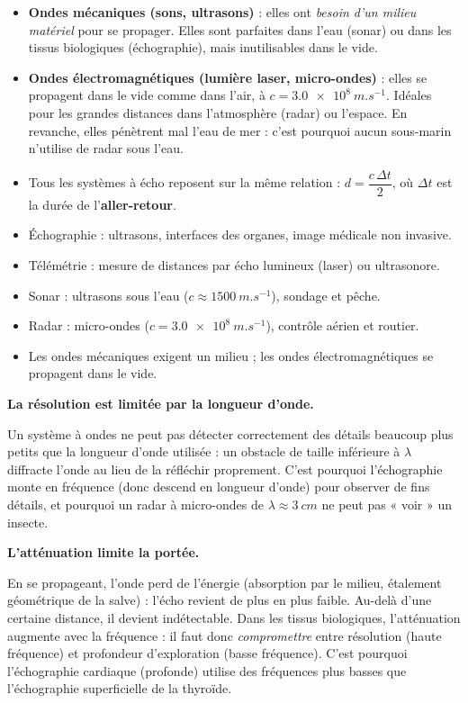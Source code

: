 \documentclass[11pt]{article}
\newcounter{popsec}
\newcounter{popsub}
\newcommand{\courssub}[1]{%
  \stepcounter{popsub}%
  \par\vspace{9pt}\noindent{\popxbold\fontsize{11.5}{13}\selectfont\color{popink}{\color{poporange}\thepopsec.\thepopsub}\hspace{6pt}#1}\par\nopagebreak\vspace{4pt}
}
\begin{document}
\begin{itemize}
\item \textbf{Ondes mécaniques (sons, ultrasons)} : elles ont \emph{besoin d'un milieu matériel} pour se propager. Elles sont parfaites dans l'eau (sonar) ou dans les tissus biologiques (échographie), mais inutilisables dans le vide.
\item \textbf{Ondes électromagnétiques (lumière laser, micro-ondes)} : elles se propagent dans le vide comme dans l'air, à $c = \SI{3,0e8}{m.s^{-1}}$. Idéales pour les grandes distances dans l'atmosphère (radar) ou l'espace. En revanche, elles pénètrent mal l'eau de mer : c'est pourquoi aucun sous-marin n'utilise de radar sous l'eau.
\end{itemize}

\begin{aretenir}
\begin{itemize}
\item Tous les systèmes à écho reposent sur la même relation : $d = \dfrac{c\,\Delta t}{2}$, où $\Delta t$ est la durée de l'\textbf{aller-retour}.
\item Échographie : ultrasons, interfaces des organes, image médicale non invasive.
\item Télémétrie : mesure de distances par écho lumineux (laser) ou ultrasonore.
\item Sonar : ultrasons sous l'eau ($c \approx \SI{1500}{m.s^{-1}}$), sondage et pêche.
\item Radar : micro-ondes ($c = \SI{3,0e8}{m.s^{-1}}$), contrôle aérien et routier.
\item Les ondes mécaniques exigent un milieu ; les ondes électromagnétiques se propagent dans le vide.
\end{itemize}
\end{aretenir}

\courssub{Limites et précautions d'usage}

\textbf{La résolution est limitée par la longueur d'onde.}\par
Un système à ondes ne peut pas détecter correctement des détails beaucoup plus petits que la longueur d'onde utilisée : un obstacle de taille inférieure à $\lambda$ diffracte l'onde au lieu de la réfléchir proprement. C'est pourquoi l'échographie monte en fréquence (donc descend en longueur d'onde) pour observer de fins détails, et pourquoi un radar à micro-ondes de $\lambda \approx \SI{3}{cm}$ ne peut pas « voir » un insecte.

\textbf{L'atténuation limite la portée.}\par
En se propageant, l'onde perd de l'énergie (absorption par le milieu, étalement géométrique de la salve) : l'écho revient de plus en plus faible. Au-delà d'une certaine distance, il devient indétectable. Dans les tissus biologiques, l'atténuation augmente avec la fréquence : il faut donc \emph{compromettre} entre résolution (haute fréquence) et profondeur d'exploration (basse fréquence). C'est pourquoi l'échographie cardiaque (profonde) utilise des fréquences plus basses que l'échographie superficielle de la thyroïde.
\end{document}
